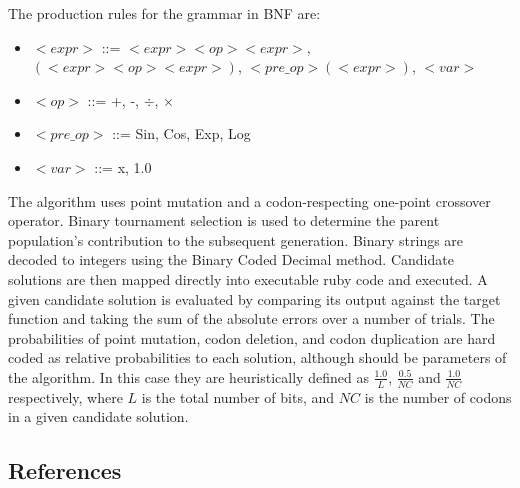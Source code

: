 The production rules for the grammar in BNF are:
\begin{itemize}
	\item $<expr>$ ::= $<expr><op><expr>$, $(<expr><op><expr>)$, $<pre\_op>(<expr>)$, $<var>$
	\item $<op>$ ::= +, -, $\div$, $\times$
	\item $<pre\_op>$ ::= Sin, Cos, Exp, Log
	\item $<var>$ ::= x, 1.0
\end{itemize}

The algorithm uses point mutation and a codon-respecting one-point crossover operator. Binary tournament selection is used to determine the parent population's contribution to the subsequent generation. 
Binary strings are decoded to integers using the Binary Coded Decimal method. Candidate solutions are then mapped directly into executable ruby code and executed. A given candidate solution is evaluated by comparing its output against the target function and taking the sum of the absolute errors over a number of trials. The probabilities of point mutation, codon deletion, and codon duplication are hard coded as relative probabilities to each solution, although should be parameters of the algorithm. In this case they are heuristically defined as $\frac{1.0}{L}$, $\frac{0.5}{NC}$ and $\frac{1.0}{NC}$ respectively, where $L$ is the total number of bits, and $NC$ is the number of codons in a given candidate solution.




\subsection{References}

